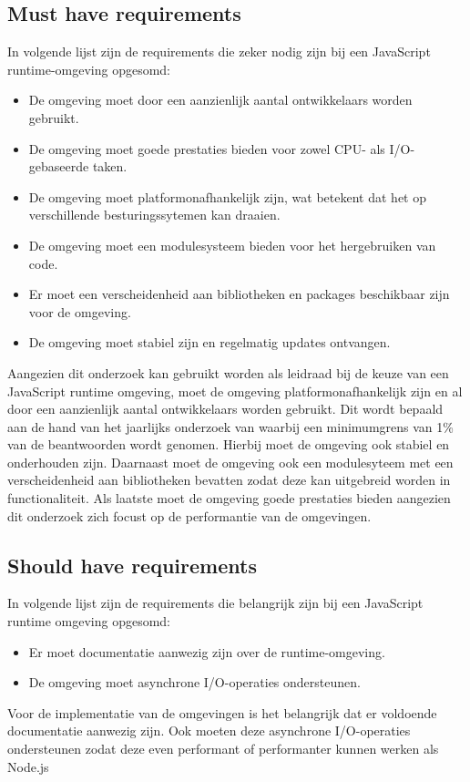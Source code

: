 \subsection{Must have requirements}
In volgende lijst zijn de requirements die zeker nodig zijn bij een JavaScript runtime-omgeving opgesomd:
\begin{itemize}
    \item De omgeving moet door een aanzienlijk aantal ontwikkelaars worden gebruikt.
    \item De omgeving moet goede prestaties bieden voor zowel CPU- als I/O-gebaseerde taken.
    \item De omgeving moet platformonafhankelijk zijn, wat betekent dat het op verschillende besturingssytemen kan draaien.
    \item De omgeving moet een modulesysteem bieden voor het hergebruiken van code.
    \item Er moet een verscheidenheid aan bibliotheken en packages beschikbaar zijn voor de omgeving.
    \item De omgeving moet stabiel zijn en regelmatig updates ontvangen.
\end{itemize}
Aangezien dit onderzoek kan gebruikt worden als leidraad bij de keuze van een JavaScript runtime omgeving, 
moet de omgeving platformonafhankelijk zijn en al door een aanzienlijk aantal ontwikkelaars worden gebruikt.
Dit wordt bepaald aan de hand van het jaarlijks onderzoek van \textcite{Greif2022} 
waarbij een minimumgrens van 1\% van de beantwoorden wordt genomen.
Hierbij moet de omgeving ook stabiel en onderhouden zijn.
Daarnaast moet de omgeving ook een modulesyteem met een verscheidenheid aan bibliotheken bevatten 
zodat deze kan uitgebreid worden in functionaliteit. 
Als laatste moet de omgeving goede prestaties bieden aangezien dit onderzoek zich focust op de performantie van de omgevingen.

\subsection{Should have requirements}
In volgende lijst zijn de requirements die belangrijk zijn bij een JavaScript runtime omgeving opgesomd:
\begin{itemize}
    \item Er moet documentatie aanwezig zijn over de runtime-omgeving.
    \item De omgeving moet asynchrone I/O-operaties ondersteunen.
\end{itemize}
Voor de implementatie van de omgevingen is het belangrijk dat er voldoende documentatie aanwezig zijn.
Ook moeten deze asynchrone I/O-operaties ondersteunen zodat deze even performant of performanter kunnen werken als Node.js

